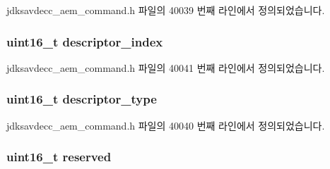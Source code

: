 jdksavdecc\+\_\+aem\+\_\+command.\+h 파일의 40039 번째 라인에서 정의되었습니다.

\subsubsection[{\texorpdfstring{descriptor\+\_\+index}{descriptor_index}}]{\setlength{\rightskip}{0pt plus 5cm}uint16\+\_\+t descriptor\+\_\+index}\hypertarget{structjdksavdecc__aem__command__authenticate_a042bbc76d835b82d27c1932431ee38d4}{}\label{structjdksavdecc__aem__command__authenticate_a042bbc76d835b82d27c1932431ee38d4}


jdksavdecc\+\_\+aem\+\_\+command.\+h 파일의 40041 번째 라인에서 정의되었습니다.

\subsubsection[{\texorpdfstring{descriptor\+\_\+type}{descriptor_type}}]{\setlength{\rightskip}{0pt plus 5cm}uint16\+\_\+t descriptor\+\_\+type}\hypertarget{structjdksavdecc__aem__command__authenticate_ab7c32b6c7131c13d4ea3b7ee2f09b78d}{}\label{structjdksavdecc__aem__command__authenticate_ab7c32b6c7131c13d4ea3b7ee2f09b78d}


jdksavdecc\+\_\+aem\+\_\+command.\+h 파일의 40040 번째 라인에서 정의되었습니다.

\subsubsection[{\texorpdfstring{reserved}{reserved}}]{\setlength{\rightskip}{0pt plus 5cm}uint16\+\_\+t reserved}\hypertarget{structjdksavdecc__aem__command__authenticate_a5a6ed8c04a3db86066924b1a1bf4dad3}{}\label{structjdksavdecc__aem__command__authenticate_a5a6ed8c04a3db86066924b1a1bf4dad3}


